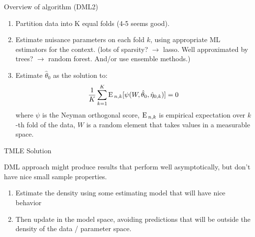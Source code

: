 \documentclass[xcolor={table}, handout]{beamer}
\begin{document}
\note{
\scriptsize \singlespacing

}
\begin{frame}{Overview of algorithm (DML2)}

\begin{enumerate}
\item Partition data into K equal folds \pause(4-5 seems good). \pause 
\item  Estimate nuisance parameters on each fold $k$, using appropriate ML estimators for the context. \pause (lots of sparsity? $\rightarrow$ lasso. Well approximated by trees? $\rightarrow$ random forest. And/or use ensemble methods.) \pause 
\item Estimate $\hat \theta_0$ as the solution to:
\[
\frac 1 K \sum_{k = 1}^K {\textrm E}\,_{n, k} [\psi(W, \hat \theta_0, \hat \eta_{0,k})] = 0
\]
where $\psi$ is the Neyman orthogonal score, ${\textrm E}\,_{n, k}$ is empirical expectation over $k$-th fold of the data, $W$ is a random element that takes values in a measurable space. 

\end{enumerate}

\end{frame}


\note{
\scriptsize \singlespacing

}
\begin{frame}{TMLE Solution}

DML approach might produce results that perform well asymptotically, but don't have nice small sample properties. \pause

\begin{enumerate}
\item Estimate the density using some estimating model that will have nice behavior \pause 
\item Then update in the model space, avoiding predictions that will be outside the density of the data / parameter space. 
\end{enumerate}

\end{frame}
\end{document}
